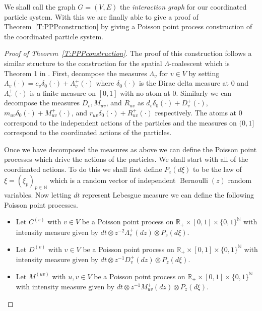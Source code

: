 \documentclass[11pt]{article}
\theoremstyle{definition}
\newcommand{\R}{\mathbb{R}}
\newcommand{\N}{\mathbb{N}}
\newcommand{\thmref}[1]{Theorem~\ref{T:#1}}
\begin{document}
\noindent We shall call the graph $G = (V, E)$ the \emph{interaction graph} for our coordinated particle system. With this we are finally able to give a proof of \thmref{PPPconstruction} by giving a Poisson point process construction of the coordinated particle system.

\begin{proof}[Proof of \thmref{PPPconstruction}]
    The proof of this construction follows a similar structure to the construction for the spatial $\Lambda$-coalescent which is Theorem 1 in \cite{spatial}. First, decompose the measures $\Lambda_v$ for $v \in V$ by setting $\Lambda_v(\cdot) = c_v\delta_0(\cdot) + \Lambda_v^+(\cdot)$ where $\delta_0(\cdot)$ is the Dirac delta measure at $0$ and $\Lambda_v^+(\cdot)$ is a finite measure on $[0,1]$ with no atom at $0$. Similarly we can decompose the measures $D_v, M_{uv}$, and $R_{uv}$ as $d_v\delta_0(\cdot) + D_v^+(\cdot)$, $m_{uv}\delta_0(\cdot) + M_{uv}^+(\cdot)$, and $r_{uv}\delta_0(\cdot) + R_{uv}^+(\cdot)$ respectively. The atoms at $0$ correspond to the independent actions of the particles and the measures on $(0,1]$ correspond to the coordinated actions of the particles.
    \medskip

    \noindent Once we have decomposed the measures as above we can define the Poisson point processes which drive the actions of the particles. We shall start with all of the coordinated actions. To do this we shall first define $P_z(d\xi)$ to be the law of $\xi = (\xi_p)_{p \in \N}$ which is a random vector of independent $\operatorname{Bernoulli}(z)$ random variables. Now letting $dt$ represent Lebesgue measure we can define the following Poisson point processes.

    \begin{itemize}
        \item Let $C^{(v)}$ with $v \in V$ be a Poisson point process on $\R_+ \times [0,1] \times \{0,1\}^\N$ with intensity measure given by $dt \otimes z^{-2}\Lambda_v^+(dz) \otimes P_z(d\xi)$.

        \item Let $D^{(v)}$ with $v \in V$ be a Poisson point process on $\R_+ \times [0,1] \times \{0,1\}^\N$ with intensity measure given by $dt \otimes z^{-1}D_v^+(dz) \otimes P_z(d\xi)$.
        
        \item Let $M^{(uv)}$ with $u,v \in V$ be a Poisson point process on $\R_+ \times [0,1] \times \{0,1\}^\N$ with intensity measure given by $dt \otimes z^{-1}M_{uv}^+(dz) \otimes P_z(d\xi)$.
        

\end{itemize}
\end{proof}
\end{document}

